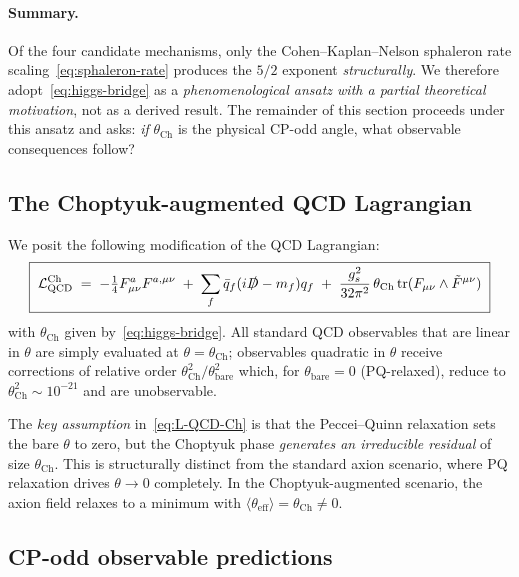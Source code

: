 \paragraph{Summary.}
Of the four candidate mechanisms, only the Cohen--Kaplan--Nelson sphaleron
rate scaling~\eqref{eq:sphaleron-rate} produces the $5/2$ exponent
\emph{structurally}.  We therefore adopt~\eqref{eq:higgs-bridge} as a
\emph{phenomenological ansatz with a partial theoretical motivation},
not as a derived result.  The remainder of this section proceeds
under this ansatz and asks: \emph{if} $\theta_{\mathrm{Ch}}$ is the
physical CP-odd angle, what observable consequences follow?

\subsection{The Choptyuk-augmented QCD Lagrangian}
\label{ssec:choptyuk-QCD-lagrangian}

We posit the following modification of the QCD Lagrangian:
\begin{equation}\label{eq:L-QCD-Ch}
  \boxed{\;
  \mathcal{L}_{\mathrm{QCD}}^{\mathrm{Ch}}
  \;=\; -\tfrac{1}{4}F^a_{\mu\nu}F^{a,\mu\nu}
  \;+\;\sum_f\bar q_f(i\slashed D-m_f)q_f
  \;+\;\frac{g_s^2}{32\pi^2}\,\theta_{\mathrm{Ch}}\,
  \mathrm{tr}(F_{\mu\nu}\wedge \tilde F^{\mu\nu})\;}
\end{equation}
with $\theta_{\mathrm{Ch}}$ given by~\eqref{eq:higgs-bridge}.
All standard QCD observables that are linear in $\theta$ are simply
evaluated at $\theta=\theta_{\mathrm{Ch}}$; observables quadratic in
$\theta$ receive corrections of relative order $\theta_{\mathrm{Ch}}^2/\theta_{\mathrm{bare}}^2$
which, for $\theta_{\mathrm{bare}}=0$ (PQ-relaxed), reduce to
$\theta_{\mathrm{Ch}}^2\sim 10^{-21}$ and are unobservable.

The \emph{key assumption} in~\eqref{eq:L-QCD-Ch} is that the Peccei--Quinn
relaxation sets the bare $\theta$ to zero, but the Choptyuk phase
\emph{generates an irreducible residual} of size $\theta_{\mathrm{Ch}}$.
This is structurally distinct from the standard axion scenario, where
PQ relaxation drives $\theta\to 0$ completely.  In the Choptyuk-augmented
scenario, the axion field relaxes to a minimum with
$\langle\theta_{\mathrm{eff}}\rangle = \theta_{\mathrm{Ch}}\neq 0$.

\subsection{CP-odd observable predictions}
\label{ssec:cp-predictions}

